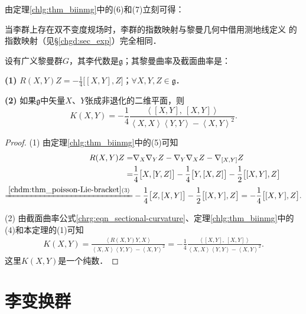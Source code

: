 由定理\ref{chlg:thm_biinmg}中的(6)和(7)立刻可得：
\begin{corollary}\label{chlg:thm_expiso}
    当李群上存在双不变度规场时，李群的指数映射与黎曼几何中借用测地线定义
    的指数映射（见\S\ref{chgd:sec_exp}）完全相同．
\end{corollary}

\begin{theorem}\label{chlg:thm_riemann-section-curvature}
    设有广义黎曼群$G$，其李代数是$\mathfrak{g}$；其黎曼曲率及截面曲率是：
    
    {\bfseries (1)} $R(X,Y)Z=-\frac{1}{4}\bigl[[X,Y],Z\bigr]$；$ \forall X,Y,Z\in \mathfrak{g}$．
    
    {\bfseries (2)} 如果$\mathfrak{g}$中矢量$X$、$Y$张成非退化的二维平面，则
    \begin{equation}
        K(X,Y)=-\frac{1}{4} \frac{\left<[X,Y],\  [X,Y]\right>}
        {\left<X,X\right>\left<Y,Y\right>-\left<X,Y\right>^2} .
    \end{equation}
\end{theorem}
\begin{proof}
    (1) 由定理\ref{chlg:thm_biinmg}中的(5)可知
    \begin{align*}
        R(X,Y)Z =& \nabla_X \nabla_Y Z - \nabla_Y \nabla_X Z - \nabla_{[X,Y]} Z \\
        =&  \frac{1}{4} \bigl[X, [Y,Z]\bigr] - \frac{1}{4} \bigl[Y, [X,Z]\bigr]
        -\frac{1}{2} \bigl[[X,Y],Z\bigr] \\
        \xlongequal{\ref{chdm:thm_poisson-Lie-bracket}(3)}&
        -\frac{1}{4} \bigl[Z, [X,Y]\bigr] -\frac{1}{2} \bigl[[X,Y],Z\bigr] 
        =  -\frac{1}{4} \bigl[[X,Y],Z\bigr] .
    \end{align*}
    
    (2) 由截面曲率公式\eqref{chrg:eqn_sectional-curvature}、定理\ref{chlg:thm_biinmg}中的(4)和本定理的(1)可知
    \begin{align*}
        K(X,Y) %
        = \frac{\left<R(X,Y)Y,X\right> } {\left<X,X\right>\left<Y,Y\right>-\left<X,Y\right>^2} 
        = -\frac{1}{4} \frac{\left<[X,Y],\  [X,Y]\right>}
        {\left<X,X\right>\left<Y,Y\right>-\left<X,Y\right>^2} .
    \end{align*}
    这里$K (X, Y)$是一个纯数．
\end{proof}


\section{李变换群}\label{chlg:sec_Lie-transformation-group}

